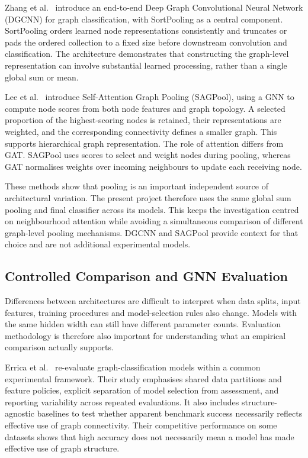\documentclass[11pt,a4paper]{article}
\begin{document}
Zhang et al.~\cite{zhang2018endtoend} introduce an end-to-end Deep Graph Convolutional Neural Network (DGCNN) for graph classification, with SortPooling as a central component. SortPooling orders learned node representations consistently and truncates or pads the ordered collection to a fixed size before downstream convolution and classification. The architecture demonstrates that constructing the graph-level representation can involve substantial learned processing, rather than a single global sum or mean.

Lee et al.~\cite{lee2019selfattention} introduce Self-Attention Graph Pooling (SAGPool), using a GNN to compute node scores from both node features and graph topology. A selected proportion of the highest-scoring nodes is retained, their representations are weighted, and the corresponding connectivity defines a smaller graph. This supports hierarchical graph representation. The role of attention differs from GAT. SAGPool uses scores to select and weight nodes during pooling, whereas GAT normalises weights over incoming neighbours to update each receiving node.

These methods show that pooling is an important independent source of architectural variation. The present project therefore uses the same global sum pooling and final classifier across its models. This keeps the investigation centred on neighbourhood attention while avoiding a simultaneous comparison of different graph-level pooling mechanisms. DGCNN and SAGPool provide context for that choice and are not additional experimental models.

\subsection{Controlled Comparison and GNN Evaluation}
\label{sec:literature-evaluation}

Differences between architectures are difficult to interpret when data splits, input features, training procedures and model-selection rules also change. Models with the same hidden width can still have different parameter counts. Evaluation methodology is therefore also important for understanding what an empirical comparison actually supports.

Errica et al.~\cite{errica2020fair} re-evaluate graph-classification models within a common experimental framework. Their study emphasises shared data partitions and feature policies, explicit separation of model selection from assessment, and reporting variability across repeated evaluations. It also includes structure-agnostic baselines to test whether apparent benchmark success necessarily reflects effective use of graph connectivity. Their competitive performance on some datasets shows that high accuracy does not necessarily mean a model has made effective use of graph structure.
\end{document}
